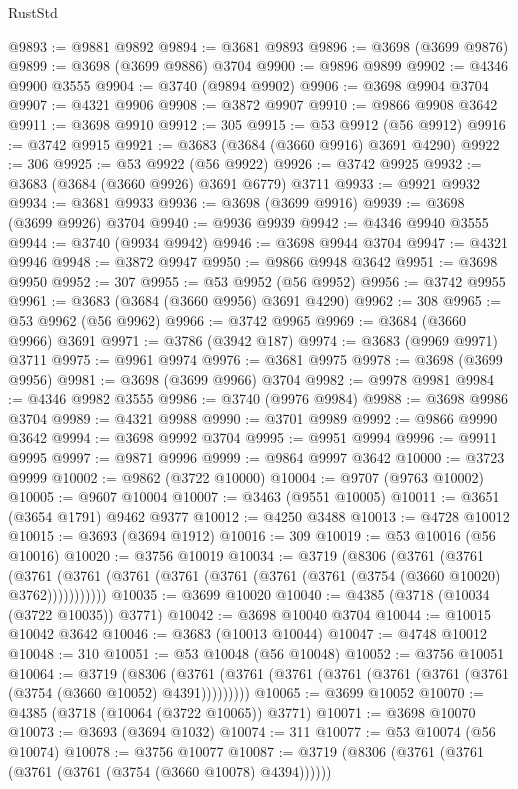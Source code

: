 \begin{lexlean}{RustStd}
\begin{coremodule}
{\begin{coremodule}
{{{{{{{{{{{{{{{{{{{{{{{{{{{{{{{{{{{{{{{{{{{{{{{@9893 := @9881 @9892
@9894 := @3681 @9893
@9896 := @3698 (@3699 @9876)
@9899 := @3698 (@3699 @9886) @3704
@9900 := @9896 @9899
@9902 := @4346 @9900 @3555
@9904 := @3740 (@9894 @9902)
@9906 := @3698 @9904 @3704
@9907 := @4321 @9906
@9908 := @3872 @9907
@9910 := @9866 @9908 @3642
@9911 := @3698 @9910
@9912 := 305
@9915 := @53 @9912 (@56 @9912)
@9916 := @3742 @9915
@9921 := @3683 (@3684 (@3660 @9916) @3691 @4290)
@9922 := 306
@9925 := @53 @9922 (@56 @9922)
@9926 := @3742 @9925
@9932 := @3683 (@3684 (@3660 @9926) @3691 @6779) @3711
@9933 := @9921 @9932
@9934 := @3681 @9933
@9936 := @3698 (@3699 @9916)
@9939 := @3698 (@3699 @9926) @3704
@9940 := @9936 @9939
@9942 := @4346 @9940 @3555
@9944 := @3740 (@9934 @9942)
@9946 := @3698 @9944 @3704
@9947 := @4321 @9946
@9948 := @3872 @9947
@9950 := @9866 @9948 @3642
@9951 := @3698 @9950
@9952 := 307
@9955 := @53 @9952 (@56 @9952)
@9956 := @3742 @9955
@9961 := @3683 (@3684 (@3660 @9956) @3691 @4290)
@9962 := 308
@9965 := @53 @9962 (@56 @9962)
@9966 := @3742 @9965
@9969 := @3684 (@3660 @9966) @3691
@9971 := @3786 (@3942 @187)
@9974 := @3683 (@9969 @9971) @3711
@9975 := @9961 @9974
@9976 := @3681 @9975
@9978 := @3698 (@3699 @9956)
@9981 := @3698 (@3699 @9966) @3704
@9982 := @9978 @9981
@9984 := @4346 @9982 @3555
@9986 := @3740 (@9976 @9984)
@9988 := @3698 @9986 @3704
@9989 := @4321 @9988
@9990 := @3701 @9989
@9992 := @9866 @9990 @3642
@9994 := @3698 @9992 @3704
@9995 := @9951 @9994
@9996 := @9911 @9995
@9997 := @9871 @9996
@9999 := @9864 @9997 @3642
@10000 := @3723 @9999
@10002 := @9862 (@3722 @10000)
@10004 := @9707 (@9763 @10002)
@10005 := @9607 @10004
@10007 := @3463 (@9551 @10005)
@10011 := @3651 (@3654 @1791) @9462 @9377
@10012 := @4250 @3488
@10013 := @4728 @10012
@10015 := @3693 (@3694 @1912)
@10016 := 309
@10019 := @53 @10016 (@56 @10016)
@10020 := @3756 @10019
@10034 := @3719
    (@8306
      (@3761
        (@3761
          (@3761 (@3761 (@3761 (@3761 (@3761 (@3761 (@3761 (@3754 (@3660 @10020) @3762)))))))))))
@10035 := @3699 @10020
@10040 := @4385 (@3718 (@10034 (@3722 @10035)) @3771)
@10042 := @3698 @10040 @3704
@10044 := @10015 @10042 @3642
@10046 := @3683 (@10013 @10044)
@10047 := @4748 @10012
@10048 := 310
@10051 := @53 @10048 (@56 @10048)
@10052 := @3756 @10051
@10064 := @3719
    (@8306 (@3761 (@3761 (@3761 (@3761 (@3761 (@3761 (@3761 (@3754 (@3660 @10052) @4391)))))))))
@10065 := @3699 @10052
@10070 := @4385 (@3718 (@10064 (@3722 @10065)) @3771)
@10071 := @3698 @10070
@10073 := @3693 (@3694 @1032)
@10074 := 311
@10077 := @53 @10074 (@56 @10074)
@10078 := @3756 @10077
@10087 := @3719 (@8306 (@3761 (@3761 (@3761 (@3761 (@3754 (@3660 @10078) @4394))))))
}}}}}}}}}}}}}}}}}}}}}}}}}}}}}}}}}}}}}}}}}}}}}}}
\end{coremodule}}
\end{coremodule}
\end{lexlean}
